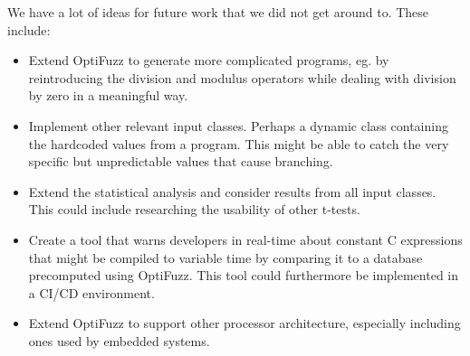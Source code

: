 We have a lot of ideas for future work that we did not get around to. These include:
\begin{itemize}
    \setlength\itemsep{-0.6em}
    \item Extend OptiFuzz to generate more complicated programs, eg. by reintroducing the division and modulus operators while dealing with division by zero in a meaningful way.
    \item Implement other relevant input classes. Perhaps a dynamic class containing the hardcoded values from a program. This might be able to catch the very specific but unpredictable values that cause branching.
    \item Extend the statistical analysis and consider results from all input classes. This could include researching the usability of other t-tests.
    \item Create a tool that warns developers in real-time about constant C expressions that might be compiled to variable time by comparing it to a database precomputed using OptiFuzz. This tool could furthermore be implemented in a CI/CD environment.
    \item Extend OptiFuzz to support other processor architecture, especially including ones used by embedded systems.
\end{itemize}
